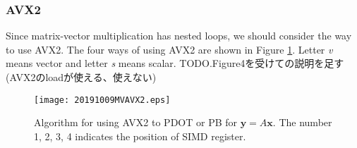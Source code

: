 \documentclass{IOS-Book-Article}
\begin{document}
\subsubsection{AVX2}
Since matrix-vector multiplication has nested loops, we should consider the way to use AVX2. The four ways of using AVX2 are shown in Figure \ref{figimpAVX}. Letter {\it v} means vector and letter {\it s} means scalar. 
TODO.Figure4を受けての説明を足す(AVX2のloadが使える、使えない)
\begin{figure}[htbp]
  \begin{center}
    \texttt{[image: 20191009MVAVX2.eps]}
    \caption{Algorithm for using AVX2 to PDOT or PB for $\bm{y} = A\bm{x}$. The number 1, 2, 3, 4 indicates the position of SIMD register. }
    \label{figimpAVX}
  \end{center}
\end{figure}
\end{document}
